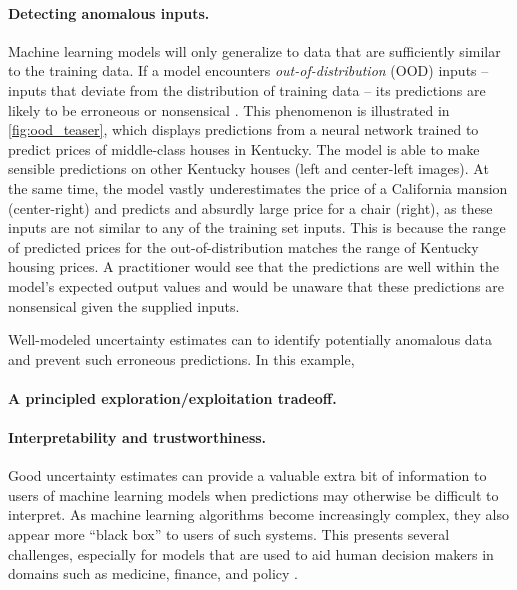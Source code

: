 \paragraph{Detecting anomalous inputs.}
Machine learning models will only generalize to data that are sufficiently similar to the training data.
If a model encounters \emph{out-of-distribution} (OOD) inputs -- inputs that deviate from the distribution of training data -- its predictions are likely to be erroneous or nonsensical \cite{begoli2019uncertainty,jiang2012calibrating}.
This phenomenon is illustrated in \autoref{fig:ood_teaser}, which displays predictions from a neural network trained to predict prices of middle-class houses in Kentucky.
The model is able to make sensible predictions on other Kentucky houses (left and center-left images).
At the same time, the model vastly underestimates the price of a California mansion (center-right) and predicts and absurdly large price for a chair (right), as these inputs are not similar to any of the training set inputs.
This is because the range of predicted prices for the out-of-distribution matches the range of Kentucky housing prices.
A practitioner would see that the predictions are well within the model's expected output values and would be unaware that these predictions are nonsensical given the supplied inputs.

Well-modeled uncertainty estimates can to identify potentially anomalous data and prevent such erroneous predictions.
In this example, 

\paragraph{A principled exploration/exploitation tradeoff.}

\paragraph{Interpretability and trustworthiness.}
Good uncertainty estimates can provide a valuable extra bit of information to users of machine learning models when predictions may otherwise be difficult to interpret.
As machine learning algorithms become increasingly complex, they also appear more ``black box'' to users of such systems.
This presents several challenges, especially for models that are used to aid human decision makers in domains such as medicine, finance, and policy .

